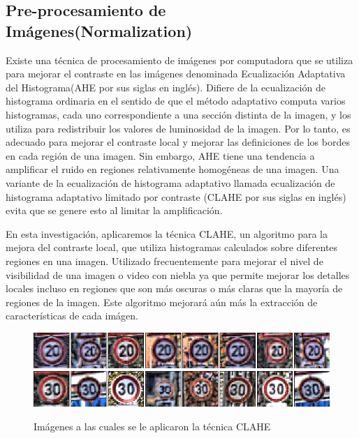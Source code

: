
	\subsection{Pre-procesamiento de Imágenes(Normalization)}
		Existe una técnica de procesamiento de imágenes por computadora que se utiliza para mejorar el contraste en las imágenes denominada Ecualización Adaptativa del Histograma(AHE por sus siglas en inglés). Difiere de la ecualización de histograma ordinaria en el sentido de que el método adaptativo computa varios histogramas, cada uno correspondiente a una sección distinta de la imagen, y los utiliza para redistribuir los valores de luminosidad de la imagen. Por lo tanto, es adecuado para mejorar el contraste local y mejorar las definiciones de los bordes en cada región de una imagen. Sin embargo, AHE tiene una tendencia a amplificar el ruido en regiones relativamente homogéneas de una imagen. Una variante de la ecualización de histograma adaptativo llamada ecualización de histograma adaptativo limitado por contraste (CLAHE por sus siglas en inglés) evita que se genere esto al limitar la amplificación.

		En esta investigación, aplicaremos la técnica CLAHE, un algoritmo para la mejora del contraste local, que utiliza histogramas calculados sobre diferentes regiones en una imagen. Utilizado frecuentemente para mejorar el nivel de visibilidad de una imagen o video con niebla ya que permite mejorar los detalles locales incluso en regiones que son más oscuras o más claras que la mayoría de regiones de la imagen. Este algoritmo mejorará aún más la extracción de características de cada imágen.\citep{CLAHE}

			\begin{figure}[H]
			\includegraphics[width=1\textwidth]{images/desarrollo/Normalization_Processing/norm_test1}
			\includegraphics[width=1\textwidth]{images/desarrollo/Normalization_Processing/norm_test2}
			\begin{center}
			\caption{\small{Imágenes a las cuales se le aplicaron la técnica CLAHE }}
			\vspace{-1em}
			{\small{\fontsize{10}{16.8}\selectfont {Fuente propia}}}
			\end{center}
			\vspace{-1.5em}
			\end{figure}

